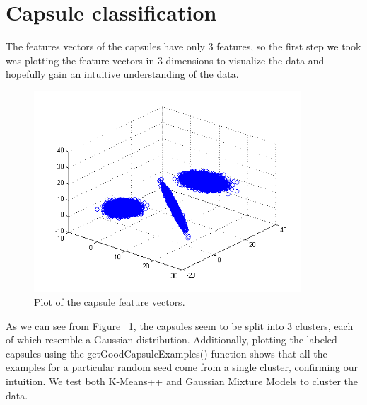 \documentclass[11pt]{amsart}
\begin{document}
\section{Capsule classification}

The features vectors of the capsules have only 3 features, so the first step we took was plotting the feature vectors in 3 dimensions to visualize the data and hopefully gain an intuitive understanding of the data.

\begin{figure}[h]
	\includegraphics[width=10cm]{capsuleCluster.png}
	\caption{Plot of the capsule feature vectors.}
	\label{fig:capsules}
\end{figure}

As we can see from Figure ~\ref{fig:capsules}, the capsules seem to be split into 3 clusters, each of which resemble a Gaussian distribution. Additionally, plotting the labeled capsules using the getGoodCapsuleExamples() function shows that all the examples for a particular random seed come from a single cluster, confirming our intuition. We test both K-Means++ and Gaussian Mixture Models to cluster the data.
\end{document}
